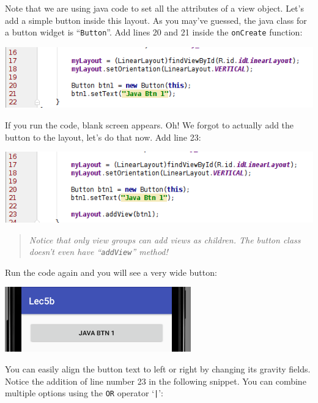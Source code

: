 Note that we are using java code to set all the attributes of a view object. Let's add a simple button inside this layout. As you may've guessed, the java class for a button widget is ``\texttt{Button}''. Add lines 20 and 21 inside the \texttt{onCreate} function:

\begin{center}
	\includegraphics[scale=0.4]{chapters/ch05/images/19}
\end{center}

If you run the code, blank screen appears. Oh! We forgot to actually add the button to the layout, let's do that now. Add line 23:

\begin{center}
	\includegraphics[scale=0.4]{chapters/ch05/images/20}
\end{center}

\vskip 3mm
\begin{quote}
	\textit{Notice that only view groups can add views as children. The button class doesn't even have ``\texttt{addView}'' method!}
\end{quote}

Run the code again and you will see a very wide button:

\begin{center}
	\includegraphics[scale=0.4]{chapters/ch05/images/21}
\end{center}

You can easily align the button text to left or right by changing its gravity fields. Notice the addition of line number 23 in the following snippet. You can combine multiple options using the \texttt{OR} operator `\texttt{|}':

